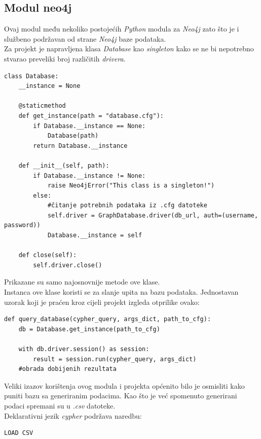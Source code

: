 \documentclass[titlepage, 12pt]{scrartcl}
\begin{document}
\subsection{Modul neo4j}
Ovaj modul među nekoliko postojećih \emph{Python} modula za \emph{Neo4j} zato što je i službeno podržavan od strane \emph{Neo4j} baze podataka. \\
Za projekt je napravljena klasa \emph{Database} kao \emph{singleton} kako se ne bi nepotrebno stvarao preveliki broj različitih \emph{drivera}.

\begin{samepage}
\begin{verbatim}
class Database:
    __instance = None

    @staticmethod
    def get_instance(path = "database.cfg"):
        if Database.__instance == None:
            Database(path)
        return Database.__instance

    def __init__(self, path):
        if Database.__instance != None:
            raise Neo4jError("This class is a singleton!")
        else:
            #čitanje potrebnih podataka iz .cfg datoteke
            self.driver = GraphDatabase.driver(db_url, auth=(username, password))
            Database.__instance = self

    def close(self):
        self.driver.close()
\end{verbatim}
\end{samepage}
Prikazane su samo najosnovnije metode ove klase. \\
Instanca ove klase koristi se za slanje upita na bazu podataka. Jednostavan uzorak koji je praćen kroz cijeli projekt izgleda otprilike ovako:
\begin{samepage}
\begin{verbatim}
def query_database(cypher_query, args_dict, path_to_cfg):
    db = Database.get_instance(path_to_cfg)
    
    with db.driver.session() as session:
        result = session.run(cypher_query, args_dict)
    #obrada dobijenih rezultata
\end{verbatim}
\end{samepage}
Veliki izazov korištenja ovog modula i projekta općenito bilo je osmisliti kako puniti bazu sa generiranim podacima. Kao što je već spomenuto generirani podaci spremani su u \emph{.csv} datoteke. \\
Deklarativni jezik \emph{cypher} podržava naredbu: 
\begin{verbatim}
LOAD CSV
\end{verbatim}
\end{document}
